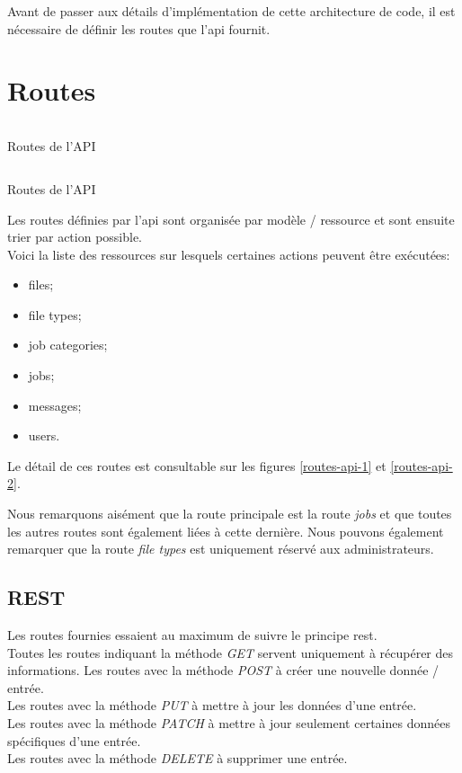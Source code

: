 \documentclass[
    iai, %
    il, %
]{heig-tb}
\begin{document}
Avant de passer aux détails d'implémentation de cette architecture de code, il est nécessaire de définir les routes que l'\Gls{api} fournit.

\section{Routes}

\begin{listing}[H]
    \inputminted{php}{assets/code/api-1.php}
    \caption{Routes de l'API \label{routes-api-2}}
\end{listing}

\begin{listing}[H]
    \inputminted{php}{assets/code/api-2.php}
    \caption{Routes de l'API \label{routes-api-1}}
\end{listing}

\newpage

Les routes définies par l'\Gls{api} sont organisée par modèle / ressource et sont ensuite trier par action possible. \\
Voici la liste des ressources sur lesquels certaines actions peuvent être exécutées:
\begin{itemize}
    \item files;
    \item file types;
    \item job categories;
    \item jobs;
    \item messages;
    \item users.
\end{itemize}

Le détail de ces routes est consultable sur les figures \ref{routes-api-1} et \ref{routes-api-2}.

Nous remarquons aisément que la route principale est la route \emph{jobs} et que toutes les autres routes sont également liées à cette dernière. Nous pouvons également remarquer que la route \emph{file types} est uniquement réservé aux administrateurs.

\subsection{REST}
Les routes fournies essaient au maximum de suivre le principe \Gls{rest}. \\
Toutes les routes indiquant la méthode \emph{GET} servent uniquement à récupérer des informations.
Les routes avec la méthode \emph{POST} à créer une nouvelle donnée / entrée. \\
Les routes avec la méthode \emph{PUT} à mettre à jour les données d'une entrée. \\
Les routes avec la méthode \emph{PATCH} à mettre à jour seulement certaines données spécifiques d'une entrée. \\
Les routes avec la méthode \emph{DELETE} à supprimer une entrée.
\end{document}
